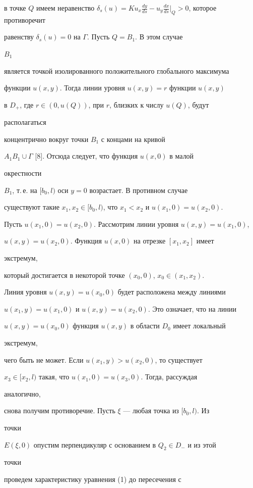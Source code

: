 в точке $Q$ имеем неравенство $\delta_s(u)=K 


u_x\frac{dy}{ds}-u_y\frac{dx}{ds}\big|_Q>0$, которое противоречит 


равенству $\delta_s(u)=0$ на $\Gamma$. Пусть $Q=B_1$. В этом случае 


$B_1$ 


является точкой изолированного положительного глобального максимума 


функции $u(x,y)$. Тогда линии уровня $u(x,y)=r$ функции $u(x,y)$ 


в $D_+$, где $r\in(0,u(Q))$, при $r$, близких к числу $u(Q)$, будут 


располагаться 


концентрично вокруг точки $B_1$ с концами на кривой 


$A_1B_1\cup\Gamma$ [8]. Отсюда следует, что функция $u(x,0)$ в малой 


окрестности 


$B_1$, т.\,е. на $[b_0,l)$ оси $y=0$ возрастает. В противном случае 


существуют такие $x_1,x_2\in[b_0,l)$, что $x_1<x_2$ и $u(x_1,0)=u(x_2,0)$. 


Пусть $u(x_1,0)=u(x_2,0)$. Рассмотрим линии уровня $u(x,y)=u(x_1,0)$, 


$u(x,y)=u(x_2,0)$. Функция $u(x,0)$ на отрезке $[x_1,x_2]$ имеет 


экстремум, 


который достигается в некоторой точке $(x_0,0)$, $x_0\in(x_1,x_2)$. 


Линия уровня $u(x,y)=u(x_0,0)$ будет расположена между линиями 


$u(x_1,y)=u(x_1,0)$ и $u(x,y)=u(x_2,0)$. Это означает, что на линии 


$u(x,y)=u(x_0,0)$ функция $u(x,y)$ в области $D_0$ имеет локальный 


экстремум, 


чего быть не может. Если $u(x_1,y)>u(x_2,0)$, то существует 


$x_3\in[x_2,l)$ такая, что $u(x_1,0)=u(x_3,0)$. Тогда, рассуждая 


аналогично, 


снова получим противоречие. Пусть $\xi$ --- любая точка из $[b_0,l)$. Из 


точки 


$E(\xi,0)$ опустим перпендикуляр с основанием в $Q_2\in D_-$ и из этой 


точки 


проведем характеристику уравнения (1) до пересечения с 


